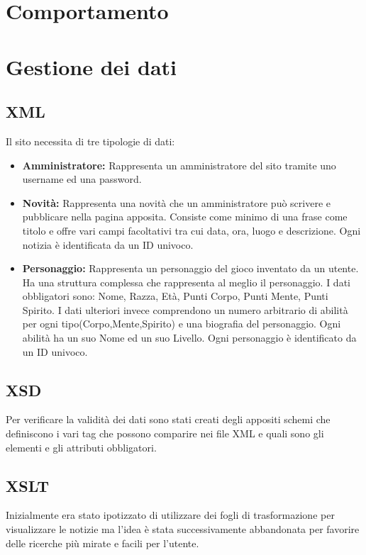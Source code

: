 \documentclass{article}
\begin{document}
\section{Comportamento}


\section{Gestione dei dati}
	\subsection{XML}
		Il sito necessita di tre tipologie di dati:
		\begin{itemize}
			\item \textbf{Amministratore: } Rappresenta un amministratore del sito tramite uno username ed una password.
			\item \textbf{Novità: } Rappresenta una novità che un amministratore può scrivere e pubblicare nella pagina apposita.
				Consiste come minimo di una frase come titolo e offre vari campi facoltativi tra cui data, ora, luogo e
				descrizione. Ogni notizia è identificata da un ID univoco.
			\item \textbf{Personaggio: } Rappresenta un personaggio del gioco inventato da un utente. Ha una struttura complessa 
				che rappresenta al meglio il personaggio. I dati obbligatori sono: Nome, Razza, Età, Punti Corpo, Punti Mente, 
				Punti Spirito. I dati ulteriori invece comprendono un numero arbitrario di abilità per ogni 
				tipo(Corpo,Mente,Spirito) e una biografia del personaggio. Ogni abilità ha un suo Nome ed un suo Livello.
				Ogni personaggio è identificato da un ID univoco.
	\end{itemize}
	
	\subsection{XSD}
		Per verificare la validità dei dati sono stati creati degli appositi schemi che definiscono i vari tag che possono
		comparire nei file XML e quali sono gli elementi e gli attributi obbligatori.
		
	\subsection{XSLT}
		Inizialmente era stato ipotizzato di utilizzare dei fogli di trasformazione per visualizzare le notizie ma l'idea 
		è stata successivamente abbandonata per favorire delle ricerche più mirate e facili per l'utente.
\end{document}
